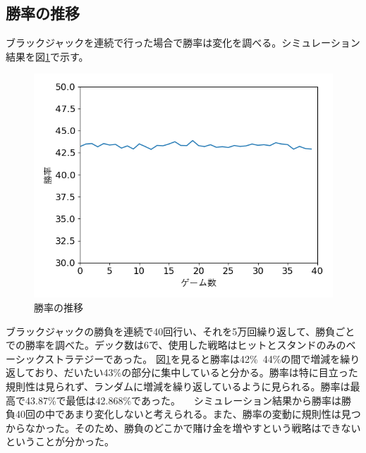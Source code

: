 \subsection{勝率の推移}
ブラックジャックを連続で行った場合で勝率は変化を調べる。シミュレーション結果を図\ref{win}で示す。
\begin{figure}[H]
 \begin{center} 
  \includegraphics[width=0.7\linewidth]{./figure/betsimulation-win}
  \caption{勝率の推移\label{win}}
 \end{center}
\end{figure}
ブラックジャックの勝負を連続で40回行い、それを5万回繰り返して、勝負ごとでの勝率を調べた。デック数は6で、使用した戦略はヒットとスタンドのみのベーシックストラテジーであった。
図\ref{win}を見ると勝率は42\%~44\%の間で増減を繰り返しており、だいたい43\%の部分に集中していると分かる。勝率は特に目立った規則性は見られず、ランダムに増減を繰り返しているように見られる。勝率は最高で43.87\%で最低は42.868\%であった。
　シミュレーション結果から勝率は勝負40回の中であまり変化しないと考えられる。また、勝率の変動に規則性は見つからなかった。そのため、勝負のどこかで賭け金を増やすという戦略はできないということが分かった。

